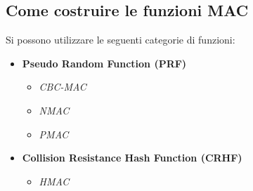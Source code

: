 \documentclass[a4paper,12pt]{article}
\begin{document}
\subsection{Come costruire le funzioni MAC}
Si possono utilizzare le seguenti categorie di funzioni:
\begin{itemize}
	\item \textbf{Pseudo Random Function (PRF)}
	\begin{itemize}
		\item \textit{CBC-MAC}
		\item \textit{NMAC}
		\item \textit{PMAC}
	\end{itemize}
	\item \textbf{Collision Resistance Hash Function (CRHF)}
	\begin{itemize}
		\item \textit{HMAC}
	\end{itemize}
\end{itemize}
\end{document}
